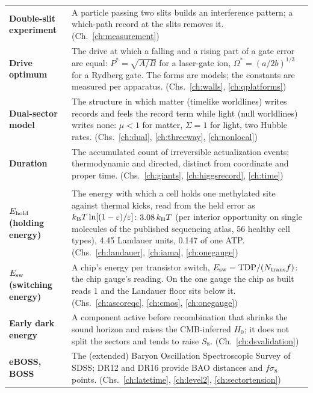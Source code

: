 {\begin{longtable}{@{}>{\raggedright\arraybackslash}p{}>{\raggedright\arraybackslash}p{}@{}}
\textbf{Double-slit experiment} & A particle passing two slits builds an interference pattern; a which-path record at the slits removes it. {\footnotesize(Ch.~\ref{ch:measurement})}\\[1pt]
\textbf{Drive optimum} & The drive at which a falling and a rising part of a gate error are equal: $P^*=\sqrt{A/B}$ for a laser-gate ion, $\Omega^*=(a/2b)^{1/3}$ for a Rydberg gate. The forms are models; the constants are measured per apparatus. {\footnotesize(Chs.~\ref{ch:walls}, \ref{ch:qplatforms})}\\[1pt]
\textbf{Dual-sector model} & The structure in which matter (timelike worldlines) writes records and feels the record term while light (null worldlines) writes none: $\mu<1$ for matter, $\Sigma=1$ for light, two Hubble rates. {\footnotesize(Chs.~\ref{ch:dual}, \ref{ch:threeway}, \ref{ch:nonlocal})}\\[1pt]
\textbf{Duration} & The accumulated count of irreversible actualization events; thermodynamic and directed, distinct from coordinate and proper time. {\footnotesize(Chs.~\ref{ch:giants}, \ref{ch:higgsrecord}, \ref{ch:time})}\\[1pt]
\multicolumn{2}{@{}l}{\normalsize\textbf{E}}\\[2pt]
\textbf{$E_{\rm hold}$ (holding energy)} & The energy with which a cell holds one methylated site against thermal kicks, read from the held error as $k_{\mathrm B} T\ln[(1-\varepsilon)/\varepsilon]$: $3.08\,k_{\mathrm B} T$ (per interior opportunity on single molecules of the published sequencing atlas, 56 healthy cell types), 4.45 Landauer units, 0.147 of one ATP. {\footnotesize(Chs.~\ref{ch:landauer}, \ref{ch:iama}, \ref{ch:onegauge})}\\[1pt]
\textbf{$E_{\rm sw}$ (switching energy)} & A chip's energy per transistor switch, $E_{\rm sw}=\mathrm{TDP}/(N_{\rm trans}f)$: the chip gauge's reading. On the one gauge the chip as built reads 1 and the Landauer floor sits below it. {\footnotesize(Chs.~\ref{ch:ascoreqc}, \ref{ch:cmos}, \ref{ch:onegauge})}\\[1pt]
\textbf{Early dark energy} & A component active before recombination that shrinks the sound horizon and raises the CMB-inferred $H_0$; it does not split the sectors and tends to raise $S_8$. {\footnotesize(Ch.~\ref{ch:dsvalidation})}\\[1pt]
\textbf{eBOSS, BOSS} & The (extended) Baryon Oscillation Spectroscopic Survey of SDSS; DR12 and DR16 provide BAO distances and $f\sigma_8$ points. {\footnotesize(Chs.~\ref{ch:latetime}, \ref{ch:level2}, \ref{ch:sectortension})}\\[1pt]

\end{longtable}}
